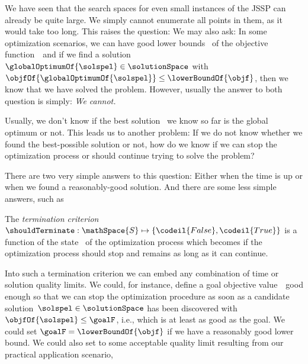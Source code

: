 %
\label{sec:terminationCriterion}%
%
We have seen that the search spaces for even small instances of the \gls{JSSP} can already be quite large.
We simply cannot enumerate all points in them, as it would take too long.
This raises the question:
We may also ask:
In some optimization scenarios, we can have good lower bounds~\lowerBoundOf{\objf} of the objective function~\objf\ and if we find a solution~$\globalOptimumOf{\solspel}\in\solutionSpace$ with $\objfOf{\globalOptimumOf{\solspel}}\leq\lowerBoundOf{\objf}$, then we know that we have solved the problem.
However, usually the answer to both question is simply:
\emph{We cannot.}

Usually, we don't know if the best solution~\bestSoFarOf{\solspel} we know so far is the global optimum or not.
This leads us to another problem:
If we do not know whether we found the best-possible solution or not, how do we know if we can stop the optimization process or should continue trying to solve the problem?

There are two very simple answers to this question:
Either when the time is up or when we found a reasonably-good solution.
And there are some less simple answers, such as 
%
%
%
\begin{definition}%
\label{def:terminationCriterion}%
The \emph{termination criterion}~$\shouldTerminate:\mathSpace{S}\mapsto\{\codeil{False}, \codeil{True}\}$ is a function of the state~ of the optimization process which becomes  if the optimization process should stop and remains  as long as it can continue.%
\end{definition}%
%
Into such a termination criterion we can embed any combination of time or solution quality limits.
We could, for instance, define a goal objective value~\goalF\ good enough so that we can stop the optimization procedure as soon as a candidate solution~$\solspel\in\solutionSpace$ has been discovered with $\objfOf{\solspel}\leq\goalF$, i.e., which is at least as good as the goal.
We could set $\goalF=\lowerBoundOf{\objf}$ if we have a reasonably good lower bound.
We could also set to some acceptable quality limit resulting from our practical application scenario, 

